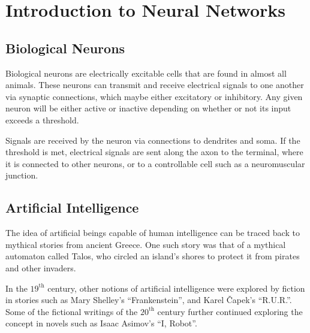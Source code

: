 \chapter{Introduction to Neural Networks}


\section{Biological Neurons}

Biological neurons are electrically excitable cells that are found in almost all
animals.
These neurons can transmit and receive electrical signals to one another via
synaptic connections, which maybe either excitatory or inhibitory.
Any given neuron will be either active or inactive depending on whether or not
its input exceeds a threshold.

\begin{center}
    
\end{center}

Signals are received by the neuron via connections to dendrites and soma.
If the threshold is met, electrical signals are sent along the axon to the
terminal, where it is connected to other neurons, or to a controllable cell such
as a neuromuscular junction.


\section{Artificial Intelligence}

The idea of artificial beings capable of human intelligence can be traced back
to mythical stories from ancient Greece.
One such story was that of a mythical automaton called Talos, who circled an
island's shores to protect it from pirates and other invaders.

In the $19^\text{th}$ century, other notions of artificial intelligence were
explored by fiction in stories such as Mary Shelley's ``Frankenstein'', and
Karel \v{C}apek's ``R.U.R.''.
Some of the fictional writings of the $20^\text{th}$ century further continued
exploring the concept in novels such as Isaac Asimov's ``I, Robot''.


